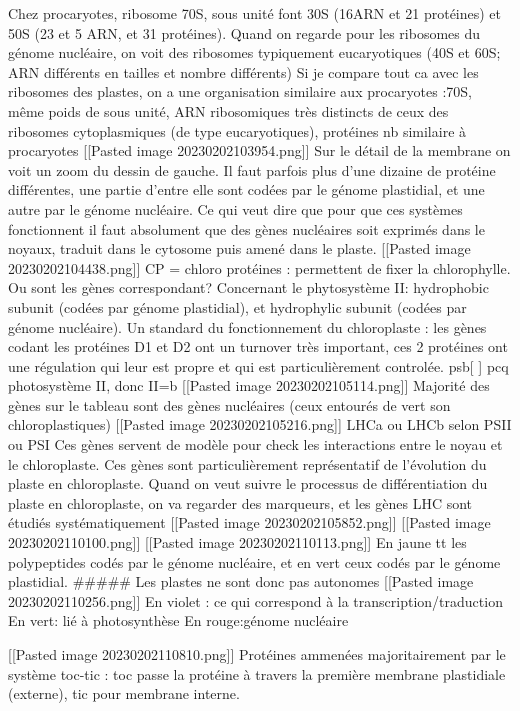 \documentclass[
]{article}
\begin{document}
Chez procaryotes, ribosome 70S, sous unité font 30S (16ARN et 21
protéines) et 50S (23 et 5 ARN, et 31 protéines). Quand on regarde pour
les ribosomes du génome nucléaire, on voit des ribosomes typiquement
eucaryotiques (40S et 60S; ARN différents en tailles et nombre
différents) Si je compare tout ca avec les ribosomes des plastes, on a
une organisation similaire aux procaryotes :70S, même poids de sous
unité, ARN ribosomiques très distincts de ceux des ribosomes
cytoplasmiques (de type eucaryotiques), protéines nb similaire à
procaryotes {[}{[}Pasted image 20230202103954.png{]}{]} Sur le détail de
la membrane on voit un zoom du dessin de gauche. Il faut parfois plus
d’une dizaine de protéine différentes, une partie d’entre elle sont
codées par le génome plastidial, et une autre par le génome nucléaire.
Ce qui veut dire que pour que ces systèmes fonctionnent il faut
absolument que des gènes nucléaires soit exprimés dans le noyaux,
traduit dans le cytosome puis amené dans le plaste. {[}{[}Pasted image
20230202104438.png{]}{]} CP = chloro protéines : permettent de fixer la
chlorophylle. Ou sont les gènes correspondant? Concernant le
phytosystème II: hydrophobic subunit (codées par génome plastidial), et
hydrophylic subunit (codées par génome nucléaire). Un standard du
fonctionnement du chloroplaste : les gènes codant les protéines D1 et D2
ont un turnover très important, ces 2 protéines ont une régulation qui
leur est propre et qui est particulièrement controlée. psb{[} {]} pcq
photosystème II, donc II=b {[}{[}Pasted image 20230202105114.png{]}{]}
Majorité des gènes sur le tableau sont des gènes nucléaires (ceux
entourés de vert son chloroplastiques) {[}{[}Pasted image
20230202105216.png{]}{]} LHCa ou LHCb selon PSII ou PSI Ces gènes
servent de modèle pour check les interactions entre le noyau et le
chloroplaste. Ces gènes sont particulièrement représentatif de
l’évolution du plaste en chloroplaste. Quand on veut suivre le processus
de différentiation du plaste en chloroplaste, on va regarder des
marqueurs, et les gènes LHC sont étudiés systématiquement {[}{[}Pasted
image 20230202105852.png{]}{]} {[}{[}Pasted image
20230202110100.png{]}{]} {[}{[}Pasted image 20230202110113.png{]}{]} En
jaune tt les polypeptides codés par le génome nucléaire, et en vert ceux
codés par le génome plastidial. \#\#\#\#\# Les plastes ne sont donc pas
autonomes {[}{[}Pasted image 20230202110256.png{]}{]} En violet : ce qui
correspond à la transcription/traduction En vert: lié à photosynthèse En
rouge:génome nucléaire

{[}{[}Pasted image 20230202110810.png{]}{]} Protéines ammenées
majoritairement par le système toc-tic : toc passe la protéine à travers
la première membrane plastidiale (externe), tic pour membrane interne.
\end{document}
